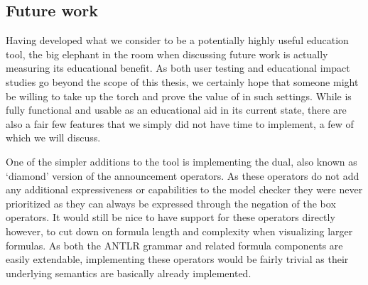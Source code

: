 



\subsection{Future work}




Having developed what we consider to be a potentially highly useful education tool, the big elephant in the room when discussing future work is actually measuring its educational benefit. As both user testing and educational impact studies go beyond the scope of this thesis, we certainly hope that someone might be willing to take up the torch and prove the value of \cname{} in such settings. While \cname{} is fully functional and usable as an educational aid in its current state, there are also a fair few features that we simply did not have time to implement, a few of which we will discuss.

One of the simpler additions to the tool is implementing the dual, also known as `diamond' version of the announcement operators. As these operators do not add any additional expressiveness or capabilities to the model checker they were never prioritized as they can always be expressed through the negation of the box operators. It would still be nice to have support for these operators directly however, to cut down on formula length and complexity when visualizing larger formulas. As both the ANTLR grammar and related formula components are easily extendable, implementing these operators would be fairly trivial as their underlying semantics are basically already implemented.

